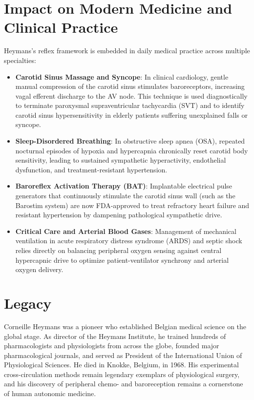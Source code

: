 \section{Impact on Modern Medicine and Clinical Practice}

Heymans's reflex framework is embedded in daily medical practice across multiple specialties:
\begin{itemize}
    \item \textbf{Carotid Sinus Massage and Syncope}: In clinical cardiology, gentle manual compression of the carotid sinus stimulates baroreceptors, increasing vagal efferent discharge to the AV node. This technique is used diagnostically to terminate paroxysmal supraventricular tachycardia (SVT) and to identify carotid sinus hypersensitivity in elderly patients suffering unexplained falls or syncope.
    \item \textbf{Sleep-Disordered Breathing}: In obstructive sleep apnea (OSA), repeated nocturnal episodes of hypoxia and hypercapnia chronically reset carotid body sensitivity, leading to sustained sympathetic hyperactivity, endothelial dysfunction, and treatment-resistant hypertension.
    \item \textbf{Baroreflex Activation Therapy (BAT)}: Implantable electrical pulse generators that continuously stimulate the carotid sinus wall (such as the Barostim system) are now FDA-approved to treat refractory heart failure and resistant hypertension by dampening pathological sympathetic drive.
    \item \textbf{Critical Care and Arterial Blood Gases}: Management of mechanical ventilation in acute respiratory distress syndrome (ARDS) and septic shock relies directly on balancing peripheral oxygen sensing against central hypercapnic drive to optimize patient-ventilator synchrony and arterial oxygen delivery.
\end{itemize}

\section{Legacy}

Corneille Heymans was a pioneer who established Belgian medical science on the global stage. As director of the Heymans Institute, he trained hundreds of pharmacologists and physiologists from across the globe, founded major pharmacological journals, and served as President of the International Union of Physiological Sciences. He died in Knokke, Belgium, in 1968. His experimental cross-circulation methods remain legendary exemplars of physiological surgery, and his discovery of peripheral chemo- and baroreception remains a cornerstone of human autonomic medicine.

